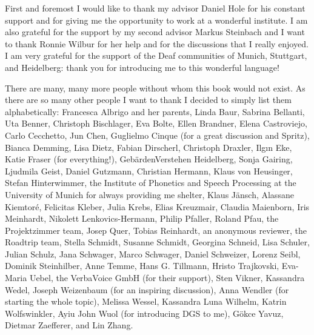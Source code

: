 \begin{refsection}

First and foremost I would like to thank my advisor Daniel Hole for his constant support and for giving me the opportunity to work at a wonderful institute. I am also grateful for the support by my second advisor Markus Steinbach and I want to thank Ronnie Wilbur for her help and for the discussions that I really enjoyed. I am very grateful for the support of the Deaf communities of Munich, Stuttgart, and Heidelberg: thank you for introducing me to this wonderful language! 

There are many, many more people without whom this book would not exist. As there are so many other people I want to thank I decided to simply list them alphabetically: Francesca Albrigo and her parents, Linda Baur, Sabrina Bellanti, Uta Benner, Christoph Bischlager, Eva Bolte, Ellen Brandner, Elena Castroviejo, Carlo Cecchetto, Jun Chen, Guglielmo Cinque (for a great discussion and Spritz), Bianca Demming, Lisa Dietz, Fabian Dirscherl, Christoph Draxler, Ilg\i n Eke, Katie Fraser (for everything!), Geb\"ardenVerstehen Heidelberg, Sonja Gairing, Ljudmila Geist, Daniel Gutzmann, Christian Hermann, Klaus von Heusinger, Stefan Hinterwimmer, the Institute of Phonetics and Speech Processing at the University of Munich for always providing me shelter, Klaus J\"ansch, Alassane Kiemtor\'{e}, Felicitas Kleber, Julia Krebs, Elias Kreuzmair, Claudia Maienborn, Iris Meinhardt, Nikolett Lenkovics-Hermann, Philip Pfaller, Roland Pfau, the Projektzimmer team, Josep Quer, Tobias Reinhardt, an anonymous reviewer, the Roadtrip team, Stella Schmidt, Susanne Schmidt, Georgina Schneid, Lisa Schuler, Julian Schulz, Jana Schwager, Marco Schwager, Daniel Schweizer, Lorenz Seibl, Dominik Steinhilber, Anne Temme, Hans G. Tillmann, Hristo Trajkovski, Eva-Maria Uebel, the VerbaVoice GmbH (for their support), Sten Vikner, Kassandra Wedel, Joseph Weizenbaum (for an inspiring discussion), Anna Wendler (for starting the whole topic), Melissa Wessel, Kassandra Luna Wilhelm, Katrin Wolfswinkler, Ayiu John Wuol (for introducing DGS to me), G\"okce Yavuz, Dietmar Zaefferer, and Lin Zhang.



\printbibliography[heading=subbibliography]
\end{refsection}
